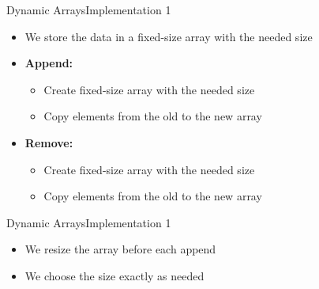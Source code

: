 \begin{frame}{Dynamic Arrays}{Implementation 1}
  \begin{itemize}
    \item
      We store the data in a fixed-size array with the needed size
    \item
      \textbf{Append:}
      \begin{itemize}
        \item
          Create fixed-size array with the needed size
        \item
          Copy elements from the old to the new array
      \end{itemize}
    \item
      \textbf{Remove:}
      \begin{itemize}
        \item
          Create fixed-size array with the needed size
        \item
          Copy elements from the old to the new array
      \end{itemize}
  \end{itemize}
\end{frame}


\begin{frame}{Dynamic Arrays}{Implementation 1}
  \begin{itemize}
    \item
      We resize the array before each append
    \item
      We choose the size exactly as needed
  \end{itemize}
\end{frame}





